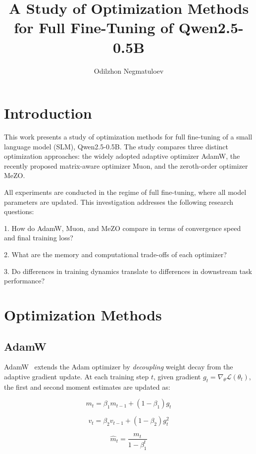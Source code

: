 \documentclass{article}
\title{A Study of Optimization Methods for Full Fine-Tuning of Qwen2.5-0.5B}
\author{ Odilzhon Negmatuloev}
\date{}
\begin{document}
\maketitle

\section{Introduction}

This work presents a study of optimization methods for full fine-tuning of a small language model (SLM), Qwen2.5-0.5B. The study compares three distinct optimization approaches: the widely adopted adaptive optimizer AdamW, the recently proposed matrix-aware optimizer Muon, and the zeroth-order optimizer MeZO.

All experiments are conducted in the regime of full fine-tuning, where all model parameters are updated. This investigation addresses the following research questions:

1. How do AdamW, Muon, and MeZO compare in terms of convergence speed and final training loss?

2. What are the memory and computational trade-offs of each optimizer?

3. Do differences in training dynamics translate to differences in downstream task performance?
\section{Optimization Methods}

\subsection{AdamW}

AdamW~\cite{loshchilov2017adamw} extends the Adam optimizer by 
\emph{decoupling} weight decay from the adaptive gradient update. 
At each training step $t$, given gradient $g_t = \nabla_\theta \mathcal{L}(\theta_t)$, 
the first and second moment estimates are updated as:

\begin{equation}
m_t = \beta_1 m_{t-1} + (1 - \beta_1) g_t
\end{equation}

\begin{equation}
v_t = \beta_2 v_{t-1} + (1 - \beta_2) g_t^2
\end{equation}

\begin{equation}
\hat{m}_t = \frac{m_t}{1 - \beta_1^t}
\end{equation}
\end{document}

